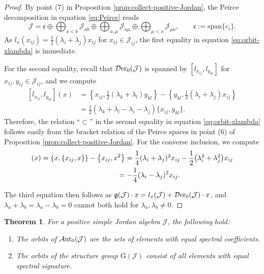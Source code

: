 \documentclass[pdftex]{sigma}
\numberwithin{equation}{section}
\newtheorem{Theorem}{Theorem}[section]
\newcommand{\Aut}{\mathcal{A}{\rm ut}}
\newcommand{\Der}{\mathcal{D}{\rm er}}
\newcommand{\Jcal}{\mathcal{J}}
\newcommand{\G}{\mathrm{G}}
\newcommand{\g}{{\mathfrak{g}}}
\newcommand{\cf}{{\mathfrak c}}
\newcommand{\sspan}{{\mathrm{span}}}
\begin{document}
\begin{proof}
By point (7) in Proposition \ref{prop:collect-positive-Jordan}, the Peirce decomposition in equation \eqref{eq:Peirce} reads
\[%
\Jcal = \cf \oplus \bigoplus_{a<b} \Jcal_{ab} \oplus \bigoplus_{a, \mu} \Jcal_{a\mu} \oplus \bigoplus_{\mu<\nu} \Jcal_{\mu\nu}, \qquad \cf := \sspan\{c_i\}.
\]
As $l_x(x_{ij}) = \frac12(\lambda_i + \lambda_j) x_{ij}$ for $x_{ij} \in \Jcal_{ij}$, the first equality in equation \eqref{eq:orbit-xlambda} is immediate.

For the second equality, recall that $\Der_0(\Jcal)$ is spanned by $[l_{x_{ij}}, l_{y_{kl}}]$ for $x_{ij}, y_{ij} \in \Jcal_{ij}$, and we compute
\begin{align*}
{}[l_{x_{ij}}, l_{y_{kl}}](x) & = \left\{x_{ij}, \frac12 (\lambda_k + \lambda_l) y_{kl}\right\} - \left\{y_{kl}, \frac12(\lambda_i + \lambda_j) x_{ij}\right\}\\
& = \frac12(\lambda_k + \lambda_l - \lambda_i - \lambda_j) \{x_{ij}, y_{kl}\}.
\end{align*}
Therefore, the relation ``$\subset$'' in the second equality in equation \eqref{eq:orbit-xlambda} follows easily from the bracket relation of the Peirce spaces in point (6) of Proposition \ref{prop:collect-positive-Jordan}.
For the converse inclusion, we compute
\begin{gather*}
 [l_x, l_{x_{ij}}](x)   = \{x, \{x_{ij}, x\}\} - \big\{x_{ij}, x^2\big\}
  = \frac14(\lambda_i + \lambda_j)^2 x_{ij} - \frac12\big(\lambda_i^2 + \lambda_j^2\big) x_{ij} \\
  \hphantom{[l_x, l_{x_{ij}}](x)}{}
  = - \frac14(\lambda_i - \lambda_j)^2 x_{ij}.
\end{gather*}

The third equation then follows as $\g(\Jcal) \cdot x = l_x(\Jcal) + \Der_0(\Jcal) \cdot x$, and $\lambda_a + \lambda_b = \lambda_a - \lambda_b = 0$ cannot both hold for $\lambda_a, \lambda_b \neq 0$.
\end{proof}

\begin{Theorem} \label{thm:orbits}
For a positive simple Jordan algebra $\Jcal$, the following hold:
\begin{enumerate}\itemsep=0pt
\item[$(1)$] The orbits of $\Aut_0(\Jcal)$ are the sets of elements with equal spectral coefficients.
\item[$(2)$] The orbits of the structure group $\G(\Jcal)$ consist of all elements with equal spectral signature.
\end{enumerate}
\end{Theorem}
\end{document}
